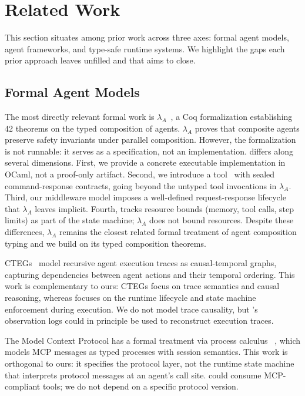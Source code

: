 \section{Related Work}
\label{sec:related}

This section situates \PAR among prior work across three axes: formal agent models,
agent frameworks, and type-safe runtime systems. We highlight the gaps each prior
approach leaves unfilled and that \PAR aims to close.

\subsection{Formal Agent Models}
\label{ssec:formal-models}

The most directly relevant formal work is $\lambda_A$~\cite{lambda-a}, a Coq
formalization establishing 42 theorems on the typed composition of agents. $\lambda_A$
proves that composite agents preserve safety invariants under parallel composition.
However, the formalization is not runnable: it serves as a specification, not an
implementation. \PAR differs along several dimensions. First, we provide a concrete
executable implementation in OCaml, not a proof-only artifact. Second, we introduce a
tool \ADT\ with sealed command-response contracts, going beyond the untyped tool
invocations in $\lambda_A$. Third, our middleware model imposes a well-defined
request-response lifecycle that $\lambda_A$ leaves implicit. Fourth, \PAR tracks
resource bounds (memory, tool calls, step limits) as part of the state machine;
$\lambda_A$ does not bound resources. Despite these differences, $\lambda_A$ remains
the closest related formal treatment of agent composition typing and we build on its
typed composition theorems.

CTEGs~\cite{ctegs} model recursive agent execution traces as causal-temporal graphs,
capturing dependencies between agent actions and their temporal ordering. This work is
complementary to ours: CTEGs focus on trace semantics and causal reasoning, whereas
\PAR focuses on the runtime lifecycle and state machine enforcement during execution.
We do not model trace causality, but \PAR's observation logs could in principle be
used to reconstruct execution traces.

The Model Context Protocol has a formal treatment via process calculus
~\cite{mcp-formal}, which models MCP messages as typed processes with session
semantics. This work is orthogonal to ours: it specifies the protocol layer, not the
runtime state machine that interprets protocol messages at an agent's call site. \PAR
could consume MCP-compliant tools; we do not depend on a specific protocol version.

